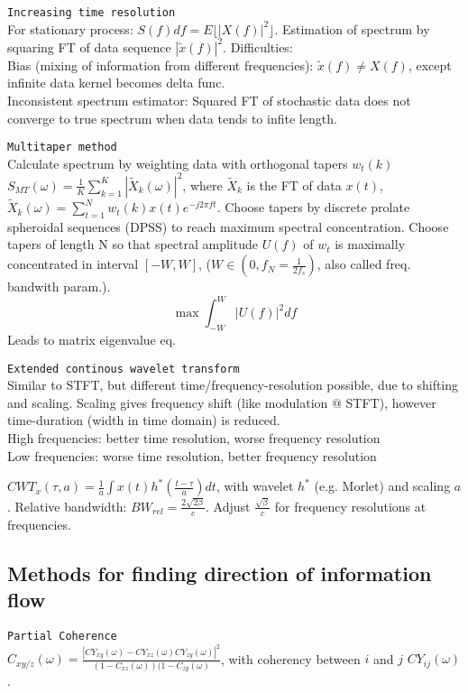 \verb!Increasing time resolution!\\
For stationary process: $S(f)df=E\lfloor |X(f)|^2 \rfloor$. Estimation of spectrum by squaring FT of data sequence $|\tilde{x}(f)|^2$.
Difficulties:\\
Bias (mixing of information from different frequencies): $\tilde{x}(f) \neq X(f)$, except infinite data \arr kernel becomes delta func. \\
Inconsistent spectrum estimator: Squared FT of stochastic data does not converge to true spectrum when data tends to infite length.\vs

\verb!Multitaper method!\\
Calculate spectrum by weighting data with orthogonal tapers $w_t(k)$\\
$S_{MT}(\omega) = \frac{1}{K} \sum_{k=1}^K |\tilde{X}_k(\omega)|^2$, where $\tilde{X}_k$ is the FT of data $x(t)$, $\tilde{X}_k(\omega)=\sum_{t=1}^N w_t(k)x(t) e^{-j2\pi f t}$. Choose tapers by discrete prolate spheroidal sequences (DPSS) to reach maximum spectral concentration. Choose tapers of length N so that spectral amplitude $U(f)$ of $w_t$ is maximally concentrated in interval $[-W,W]$, ($W\in (0,f_N=\frac{1}{2f_s})$, also called freq. bandwith param.). 
\begin{equation}
\max \int_{-W}^{W} |U(f)|^2 df
\end{equation}
Leads to matrix eigenvalue eq.\vs

\verb!Extended continous wavelet transform!\\
Similar to STFT, but different time/frequency-resolution possible, due to shifting and scaling. Scaling gives frequency shift (like modulation @ STFT), however time-duration (width in time domain) is reduced.\\
High frequencies: better time resolution, worse frequency resolution\\
Low frequencies: worse time resolution, better frequency resolution\vs

$CWT_x(\tau, a) = \frac{1}{a} \int x(t) h^*\left(\frac{t-\tau}{a}\right)dt$, with wavelet $h^*$ (e.g. Morlet) and scaling $a$. Relative bandwidth: $BW_{rel}=\frac{2\sqrt{2\beta}}{c}$. Adjust $\frac{\sqrt{\beta}}{c}$ for frequency resolutions at frequencies.\vs

\subsection{Methods for finding direction of information flow}
\verb!Partial Coherence!\\
$C_{xy/z}(\omega) = \frac{|CY_{xy}(\omega)-CY_{xz}(\omega)CY_{zy}(\omega)|^2}{(1-C_{xz}(\omega))(1-C_{zy}(\omega)}$, with coherency between $i$ and $j$ $CY_{ij}(\omega)$.\vs

